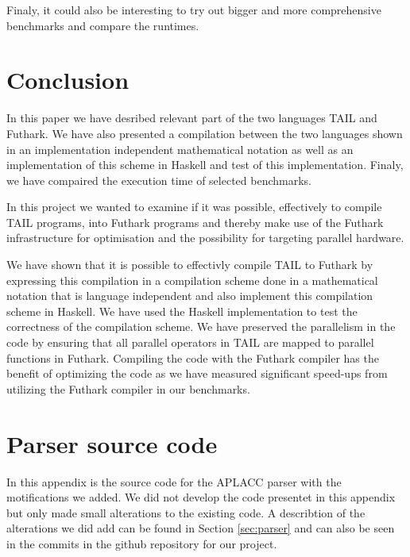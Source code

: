 \documentclass[11pt]{article}
\begin{document}
Finaly, it could also be interesting to try out bigger and more comprehensive benchmarks and compare the runtimes.

\section{Conclusion}
\label{sec:conclusion}


In this paper we have desribed relevant part of the two languages TAIL and Futhark. 
We have also presented a compilation between the two languages shown in an implementation independent mathematical notation as well as an implementation of this scheme in Haskell and test of this implementation. 
Finaly, we have compaired the execution time of selected benchmarks. 

In this project we wanted to examine if it was possible, effectively to compile TAIL programs, into Futhark programs and thereby make use of the Futhark infrastructure for optimisation and the possibility for targeting parallel hardware.

We have shown that it is possible to effectivly compile TAIL to Futhark by expressing this compilation in a compilation scheme done in a mathematical notation that is language independent and also implement this compilation scheme in Haskell. We have used the Haskell implementation to test the correctness of the compilation scheme. 
We have preserved the parallelism in the code by ensuring that all parallel operators in TAIL are mapped to parallel functions in Futhark. 
Compiling the code with the Futhark compiler has the benefit of optimizing the code as we have measured significant speed-ups from utilizing the Futhark compiler in our benchmarks.


{} 


\newpage

\appendix
\section{Parser source code}
\label{app:parser}

In this appendix is the source code for the APLACC parser \cite{APLACC} with the motifications we added.
We did not develop the code presentet in this appendix but only made small alterations to the existing code. A describtion of the alterations we did add can be found in Section \ref{sec:parser} and can also be seen in the commits in the github repository for our project. 
\end{document}
